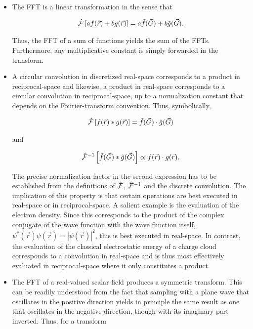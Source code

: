 \begin{itemize}
    \item 

    The FFT is a linear transformation in the sense that

    \begin{equation}
        \hat{\mathcal{F}}\left[a f(\vec{r}) + bg(\vec{r}) \right] = a\tilde{f}(\vec{G}) + b\tilde{g}(\vec{G}).
    \end{equation}
    
    Thus, the FFT of a sum of functions yields the sum of the FFTs. Furthermore, any multiplicative constant is simply forwarded in the transform.

    \item 

    A circular convolution in discretized real-space corresponds to a product in reciprocal-space and likewise, a product in real-space corresponds to a circular convolution in reciprocal-space, up to a normalization constant that depends on the Fourier-transform convention. Thus, symbolically,

    \begin{equation}
        \hat{\mathcal{F}}\left[f(\vec{r}) \ast g(\vec{r}) \right] = \tilde{f}(\vec{G}) \cdot \tilde{g}(\vec{G})
    \end{equation}

    and

    \begin{equation}
        \hat{\mathcal{F}}^{-1}\left[\tilde{f}(\vec{G}) \ast \tilde{g}(\vec{G}) \right] \propto f(\vec{r}) \cdot g(\vec{r}).
    \end{equation}

    The precise normalization factor in the second expression has to be established from the definitions of $\hat{\mathcal{F}}$, $\hat{\mathcal{F}}^{-1}$ and the discrete convolution. The implication of this property is that certain operations are best executed in real-space or in reciprocal-space. A salient example is the evaluation of the electron density. Since this corresponds to the product of the complex conjugate of the wave function with the wave function itself, $\psi^{*}(\vec{r})\psi(\vec{r})=|\psi(\vec{r})|^{2}$, this is best executed in real-space. In contrast, the evaluation of the classical electrostatic energy of a charge cloud corresponds to a convolution in real-space and is thus most effectively evaluated in reciprocal-space where it only constitutes a product.

    \item

    The FFT of a real-valued scalar field produces a symmetric transform. This can be readily understood from the fact that sampling with a plane wave that oscillates in the positive direction yields in principle the same result as one that oscillates in the negative direction, though with its imaginary part inverted. Thus, for a transform
    

\end{itemize}
